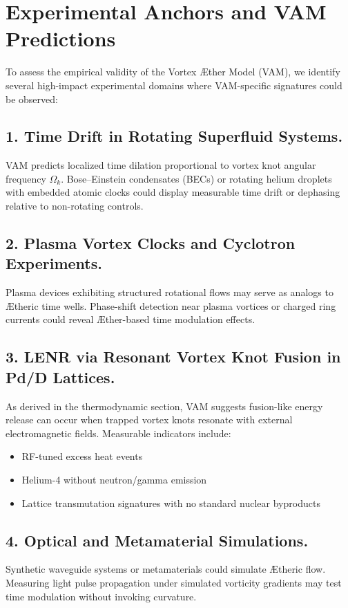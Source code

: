 \section{Experimental Anchors and VAM Predictions}


To assess the empirical validity of the Vortex Æther Model (VAM), we identify several high-impact experimental domains where VAM-specific signatures could be observed:

\subsection*{1. Time Drift in Rotating Superfluid Systems.} VAM predicts localized time dilation proportional to vortex knot angular frequency
$\Omega_k$. Bose–Einstein condensates (BECs) or rotating helium droplets with embedded atomic clocks could display measurable time drift or dephasing relative to non-rotating controls.

\subsection*{2. Plasma Vortex Clocks and Cyclotron Experiments.} Plasma devices exhibiting structured rotational flows may serve as analogs to Ætheric time wells. Phase-shift detection near plasma vortices or charged ring currents could reveal Æther-based time modulation effects.

\subsection*{3. LENR via Resonant Vortex Knot Fusion in Pd/D Lattices.} As derived in the thermodynamic section, VAM suggests fusion-like energy release can occur when trapped vortex knots resonate with external electromagnetic fields. Measurable indicators include:
\begin{itemize}
    \item RF-tuned excess heat events
    \item Helium-4 without neutron/gamma emission
    \item Lattice transmutation signatures with no standard nuclear byproducts
\end{itemize}

\subsection*{4. Optical and Metamaterial Simulations.} Synthetic waveguide systems or metamaterials could simulate Ætheric flow. Measuring light pulse propagation under simulated vorticity gradients may test time modulation without invoking curvature.

